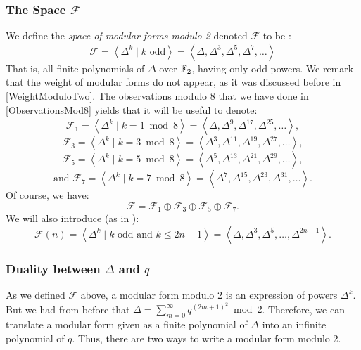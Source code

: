 \subsubsection{The Space $\mathcal{F}$}
\label{ModularFormsModTwo}
We define the \textit{space of modular forms modulo 2} denoted $\mathcal{F} $ to be \cite[2.1]{OrdreNilpotenceOperateurHecke}:
$$
\mathcal{F}
= \left\langle \Delta^k \mid k \text{ odd} \right\rangle
= \left\langle \Delta, \Delta^3, \Delta^5, \Delta^7, \dots \right\rangle 
$$
That is, all finite polynomials of $\Delta$ over $\mathbb{F}_2$, having only odd powers.
We remark that the weight of modular forms do not appear, as it was discussed before in \ref{WeightModuloTwo}.
The observations modulo 8 that we have done in \ref{ObservationsMod8} yields that it will be useful to denote:
$$
\mathcal{F}_1
= \left\langle \Delta^k \mid k = 1 \bmod 8 \right\rangle
= \left\langle \Delta, \Delta^9, \Delta^{17}, \Delta^{25}, \dots \right\rangle,
$$
$$
\mathcal{F}_3
= \left\langle \Delta^k \mid k = 3 \bmod 8 \right\rangle
= \left\langle \Delta^3, \Delta^{11}, \Delta^{19}, \Delta^{27}, \dots \right\rangle,
$$
$$
\mathcal{F}_5
= \left\langle \Delta^k \mid k = 5 \bmod 8 \right\rangle
= \left\langle \Delta^5, \Delta^{13}, \Delta^{21}, \Delta^{29}, \dots \right\rangle,
$$
$$
\text{and }
\mathcal{F}_7
= \left\langle \Delta^k \mid k = 7 \bmod 8 \right\rangle
= \left\langle \Delta^7, \Delta^{15}, \Delta^{23}, \Delta^{31}, \dots \right\rangle.
$$
Of course, we have:
$$
\mathcal{F} = \mathcal{F}_1 \oplus \mathcal{F}_3 \oplus \mathcal{F}_5 \oplus \mathcal{F}_7.
$$
We will also introduce (as in \cite[2.]{StructureAlgebreHecke}):
$$
\mathcal{F}(n)
= \left\langle \Delta^k \mid k \text{ odd} \text{ and } k \leq 2n-1 \right\rangle
= \left\langle \Delta, \Delta^3, \Delta^5, \dots, \Delta^{2n-1} \right\rangle.
$$

\subsubsection{Duality between $\Delta$ and $q$}
As we defined $\mathcal{F}$ above, a modular form modulo 2 is an expression of powers $\Delta^k$.
But we had from before that $\Delta = \sum_{m=0}^{\infty} q^{(2m+1)^2} \bmod 2$.
Therefore, we can translate a modular form given as a finite polynomial of $\Delta$ into an infinite polynomial of $q$.
Thus, there are two ways to write a modular form modulo 2.

